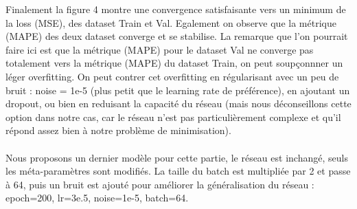 \documentclass{article}
\begin{document}
    Finalement la figure 4 montre une convergence satisfaisante vers un minimum  de la loss (MSE), des dataset Train et Val. Egalement on observe que la métrique (MAPE) des deux dataset converge et se stabilise. La remarque que l'on pourrait faire ici est que la métrique (MAPE) pour le dataset Val ne converge pas totalement vers la métrique (MAPE) du dataset Train, on peut soupçonnner un léger overfitting. On peut contrer cet overfitting en régularisant avec un peu de bruit : noise = 1e-5 (plus petit que le learning rate de préférence), en ajoutant un dropout, ou bien en reduisant la capacité du réseau (mais nous déconseillons cette option dans notre cas, car le réseau n'est pas particulièrement  complexe et qu'il répond assez bien à notre problème de minimisation).
    \\\\
    Nous proposons un dernier modèle pour cette partie, le réseau est inchangé, seuls les méta-paramètres sont modifiés. La taille du batch est multipliée par 2 et passe à 64, puis un bruit est ajouté pour améliorer la généralisation du réseau : epoch=200, lr=3e.5, noise=1e-5, batch=64.
    
\end{document}
